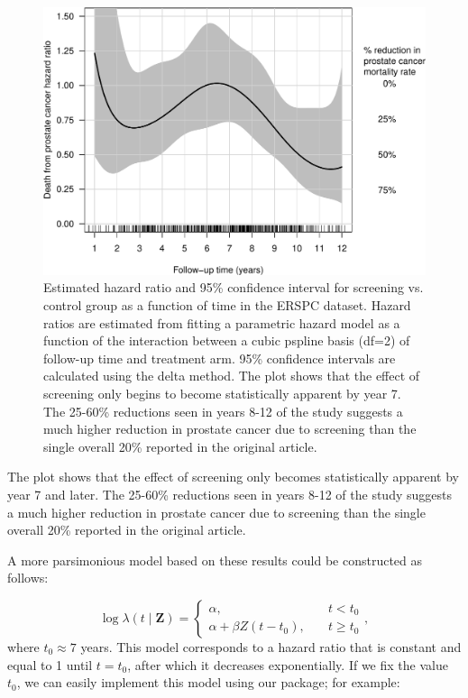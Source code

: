 \begin{Schunk}
\begin{figure}[ht]
\includegraphics[width=\textwidth,keepaspectratio=true]{./interaction-ERSPC-1} \caption[Estimated hazard ratio and 95\% confidence interval for screening vs]{Estimated hazard ratio and 95\% confidence interval for screening vs. control group as a function of time in the ERSPC dataset. Hazard ratios are estimated from fitting a parametric hazard model as a function of the interaction between a cubic pspline basis (df=2) of follow-up time and treatment arm. 95\% confidence intervals are calculated using the delta method. The plot shows that the effect of screening only begins to become statistically apparent by year 7. The 25-60\% reductions seen in years 8-12 of the study suggests a much higher reduction in prostate cancer due to screening than the single overall 20\% reported in the original article.}\label{fig:interaction-ERSPC}
\end{figure}
\end{Schunk}

The plot shows that the effect of screening only becomes statistically
apparent by year 7 and later. The 25-60\% reductions seen in years 8-12
of the study suggests a much higher reduction in prostate cancer due to
screening than the single overall 20\% reported in the original article.

A more parsimonious model based on these results could be constructed as
follows:

\[ \log \lambda\left(t \mid \mathbf{Z}\right) = \begin{cases} \alpha, &\quad t < t_0\\
\alpha + \beta Z(t - t_0), &\quad t \geq t_0\end{cases},\] where
\(t_0 \approx 7\) years. This model corresponds to a hazard ratio that
is constant and equal to 1 until \(t = t_0\), after which it decreases
exponentially. If we fix the value \(t_0\), we can easily implement this
model using our package; for example:

